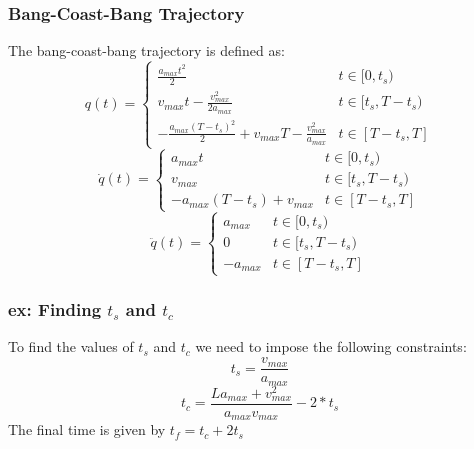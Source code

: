 \documentclass[a4paper,12pt]{article}
\begin{document}
\subsubsection{Bang-Coast-Bang Trajectory}
The bang-coast-bang trajectory is defined as:
\begin{equation}
        q(t) = \begin{cases}
            \frac{a_{max}t^2}{2} & t \in [0,t_s)\\
            v_{max}t - \frac{v^2_{max}}{2a_{max}} & t \in [t_s,T-t_s)\\
            -\frac{a_{max}(T-t_s)^2}{2}+v_{max}T -\frac{v^2_{max}}{a_{max}} & t \in [T-t_s,T]
        \end{cases}
    \end{equation}
    \begin{equation}
        \dot{q}(t) = \begin{cases}
            a_{max}t & t \in [0,t_s)\\
            v_{max} & t \in [t_s,T-t_s)\\
            -a_{max}(T-t_s)+v_{max} & t \in [T-t_s,T]
        \end{cases}
    \end{equation}
    \begin{equation}
        \ddot{q}(t) = \begin{cases}
            a_{max} & t \in [0,t_s)\\
            0 & t \in [t_s,T-t_s)\\
            -a_{max} & t \in [T-t_s,T]
        \end{cases}
\end{equation}
\subsubsection{ex: Finding $t_s$ and $t_c$}
To find the values of $t_s$ and $t_c$ we need to impose the following constraints:
\begin{equation}
t_s = \frac{v_{max}}{a_{max}} 
\end{equation}
\begin{equation}
    t_c = \frac{La_{max} + v^2_{max}}{a_{max}v_{max}} - 2*t_s
    \end{equation}
 The final time is given by $t_f = t_c + 2t_s$
\end{document}
